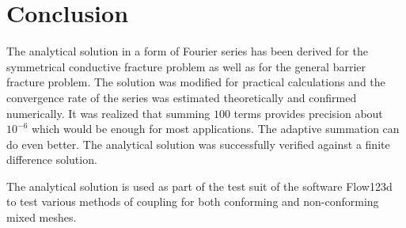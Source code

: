 \documentclass[sn-mathphys,Numbered]{sn-jnl}
\begin{document}
\section{Conclusion}
\label{sec:conclusion}
The analytical solution in a form of Fourier series has been derived for the symmetrical conductive fracture problem as well as for 
the general barrier fracture problem. The solution was modified for practical calculations and the convergence rate of the series was estimated theoretically and 
confirmed numerically. It was realized that summing $100$ terms provides precision about $10^{-6}$ which would be enough for most applications.
The adaptive summation can do even better. The analytical solution was successfully verified against a finite difference solution.  

The analytical solution is used as part of the test suit of the software Flow123d \cite{flow123d} to test various methods of coupling for both conforming 
and non-conforming mixed meshes.





\end{document}
